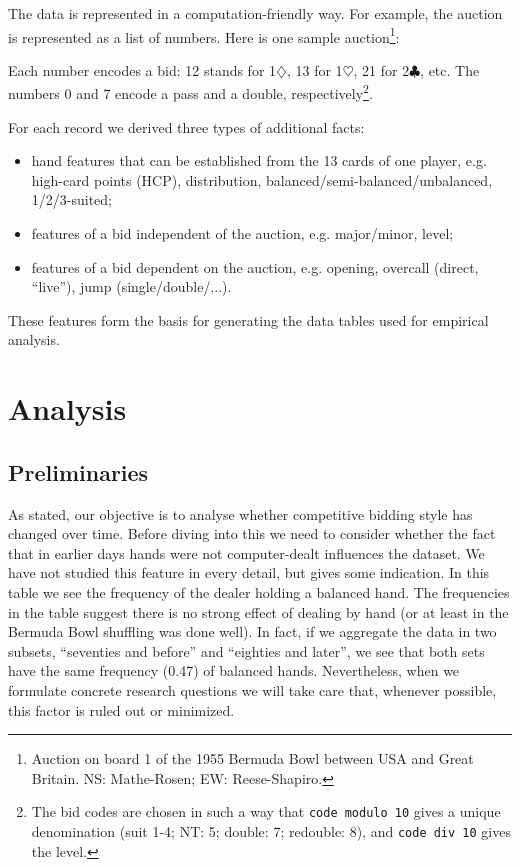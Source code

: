 \documentclass{icga}
\begin{document}
The data is represented in a computation-friendly way. For example,
the auction is represented as a list of numbers. Here is one sample
auction\footnote{%
  Auction on board 1 of the 1955 Bermuda Bowl between USA and Great
  Britain. NS: Mathe-Rosen; EW: Reese-Shapiro.}:

\begin{code}
    [12,13,7,0,0,21,22,31,32,0,0,0]
\end{code}

Each number encodes a bid: 12 stands for 1$\diamondsuit$, 13 for
1$\heartsuit$, 21 for 2$\clubsuit$, etc. The numbers 0 and 7 encode a
pass and a double, respectively\footnote{%
  The bid codes are chosen in such a way that \texttt{code modulo 10}
  gives a unique denomination (suit 1-4; NT: 5; double: 7; redouble:
  8), and \texttt{code div 10} gives the level.}.

For each record we derived three types of additional facts: 
\begin{itemize}
\item hand features that can be established from the 13 cards of one
  player, e.g. high-card points (HCP), distribution,
  balanced/semi-balanced/unbalanced, 1/2/3-suited;
\item features of a bid independent of the auction, e.g.  major/minor,
  level;
\item features of a bid dependent on the auction, e.g. opening,
  overcall (direct, ``live''), jump (single/double/...).
\end{itemize}
 
These features form the basis for generating the data tables used for
empirical analysis. 

\section{Analysis}
\label{sec:analysis}

\subsection{Preliminaries}

As stated, our objective is to analyse whether competitive bidding
style has changed over time.  Before diving into this we need to
consider whether the fact that in earlier days hands were not
computer-dealt influences the dataset. We have not studied this
feature in every detail, but  gives some
indication. In this table we see the frequency of the dealer holding a
balanced hand. The frequencies in the table suggest there is no strong
effect of dealing by hand (or at least in the Bermuda Bowl shuffling
was done well). In fact, if we aggregate the data in two subsets,
``seventies and before'' and ``eighties and later'', we see that both
sets have the same frequency (0.47) of balanced hands. Nevertheless,
when we formulate concrete research questions we will take care that,
whenever possible, this factor is ruled out or minimized.
\end{document}
